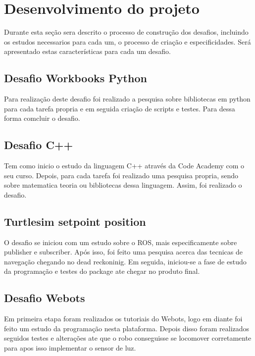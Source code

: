 \chapter{Desenvolvimento do projeto}
\label{chap:metod}

Durante esta seção sera descrito o processo de construção dos desafios, incluindo os estudos necessarios para cada um, o processo de criação e especificidades. Será apresentado estas características para cada um desafio.

\section{Desafio Workbooks Python}

Para realização deste desafio foi realizado a pesquisa sobre bibliotecas em python para cada tarefa propria e em seguida criação de scripts e testes. Para dessa forma comcluir o desafio.

\section{Desafio C++}

Tem como inicio o estudo da linguagem C++ através da Code Academy com o seu curso. Depois, para cada tarefa foi realizado uma pesquisa propria, sendo sobre matematica teoria ou bibliotecas dessa linguagem. Assim, foi realizado o desafio.

\section{Turtlesim setpoint position}

O desafio se iniciou com um estudo sobre o ROS, mais especificamente sobre publisher e subscriber. Após isso, foi feito uma pesquisa acerca das tecnicas de navegação chegando no dead reckoninig. Em seguida, iniciou-se a fase de estudo da programação e testes do package ate chegar no produto final.

\section{Desafio Webots}

Em primeira etapa foram realizados os tutoriais do Webots, logo em diante foi feito um estudo da programação nesta plataforma. Depois disso foram realizados seguidos testes e alterações ate que o robo conseguisse se locomover corretamente para apos isso implementar o sensor de luz.

